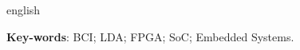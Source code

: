 \begin{resumo}[Abstract]
 \begin{otherlanguage*}{english}

   \vspace{\onelineskip}
 
   \noindent 
   \textbf{Key-words}: BCI; LDA; FPGA; SoC; Embedded Systems.
 \end{otherlanguage*}
\end{resumo}
